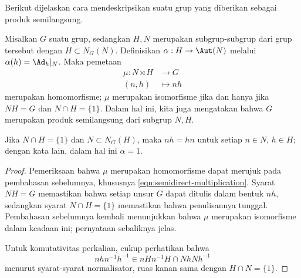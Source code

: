 Berikut dijelaskan cara mendeskripsikan suatu grup yang diberikan sebagai produk semilangsung.
\begin{lemma}\label{prop:internal-semidirect}
	Misalkan $G$ suatu grup, sedangkan $H, N$ merupakan subgrup-subgrup dari grup tersebut dengan $H \subset N_G(N)$. Definisikan $\alpha: H \to \Aut(N)$ melalui $\alpha(h) = \Ad_h|_N$. Maka pemetaan
	\begin{align*}
		\mu: N \rtimes H & \longrightarrow G \\
		(n, h) & \longmapsto nh
	\end{align*}
	merupakan homomorfisme; $\mu$ merupakan isomorfisme jika dan hanya jika $NH = G$ dan $N \cap H = \{1\}$. Dalam hal ini, kita juga mengatakan bahwa $G$ merupakan produk semilangsung dari subgrup $N, H$.
	
	Jika $N \cap H = \{1\}$ dan $N \subset N_G(H)$, maka $nh=hn$ untuk setiap $n \in N$, $h \in H$; dengan kata lain, dalam hal ini $\alpha=1$.
\end{lemma}
\begin{proof}
	Pemeriksaan bahwa $\mu$ merupakan homomorfisme dapat merujuk pada pembahasan sebelumnya, khususnya \eqref{eqn:semidirect-multiplication}. Syarat $NH=G$ memastikan bahwa setiap unsur $G$ dapat ditulis dalam bentuk $nh$, sedangkan syarat $N \cap H = \{1\}$ memastikan bahwa penulisannya tunggal. Pembahasan sebelumnya kembali menunjukkan bahwa $\mu$ merupakan isomorfisme dalam keadaan ini; pernyataan sebaliknya jelas.
	
	Untuk komutativitas perkalian, cukup perhatikan bahwa
	\[ nhn^{-1}h^{-1} \in nHn^{-1}H \cap N hNh^{-1} \]
	menurut syarat-syarat normalisator, ruas kanan sama dengan $H \cap N = \{1\}$.
\end{proof}

